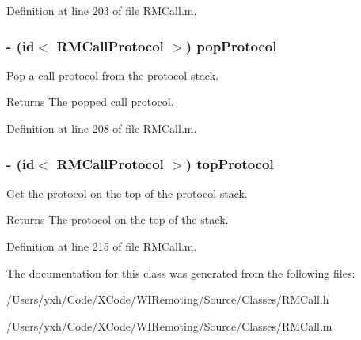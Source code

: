 Definition at line 203 of file RMCall.m.\hypertarget{interface_r_m_call_a2f55cbd7d34e98e4dbc74e1d8d8facf8}{
\subsubsection[{popProtocol}]{\setlength{\rightskip}{0pt plus 5cm}-\/ (id$<$ {\bf RMCallProtocol} $>$) popProtocol }}
\label{interface_r_m_call_a2f55cbd7d34e98e4dbc74e1d8d8facf8}


Pop a call protocol from the protocol stack. \begin{DoxyReturn}{Returns}
The popped call protocol. 
\end{DoxyReturn}


Definition at line 208 of file RMCall.m.\hypertarget{interface_r_m_call_a306021de3467cc71a876068cbed9d834}{
\subsubsection[{topProtocol}]{\setlength{\rightskip}{0pt plus 5cm}-\/ (id$<$ {\bf RMCallProtocol} $>$) topProtocol }}
\label{interface_r_m_call_a306021de3467cc71a876068cbed9d834}


Get the protocol on the top of the protocol stack. \begin{DoxyReturn}{Returns}
The protocol on the top of the stack. 
\end{DoxyReturn}


Definition at line 215 of file RMCall.m.

The documentation for this class was generated from the following files:\begin{DoxyCompactItemize}
\item 
/Users/yxh/Code/XCode/WIRemoting/Source/Classes/RMCall.h\item 
/Users/yxh/Code/XCode/WIRemoting/Source/Classes/RMCall.m\end{DoxyCompactItemize}
